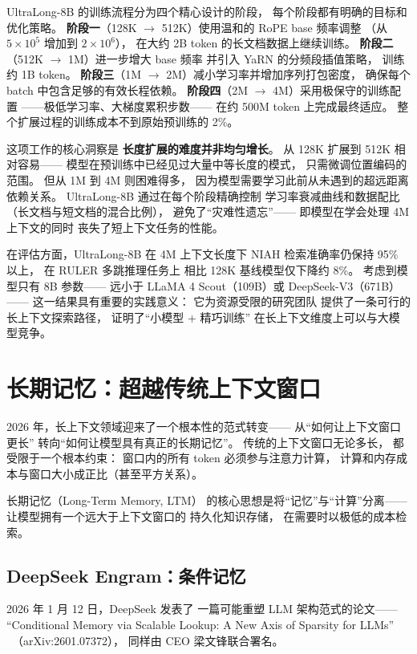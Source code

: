 UltraLong-8B 的训练流程分为四个精心设计的阶段，
每个阶段都有明确的目标和优化策略。
\textbf{阶段一}（128K $\to$ 512K）使用温和的 RoPE base 频率调整
（从 $5 \times 10^5$ 增加到 $2 \times 10^6$），
在大约 2B token 的长文档数据上继续训练。
\textbf{阶段二}（512K $\to$ 1M）进一步增大 base 频率
并引入 YaRN 的分频段插值策略，
训练约 1B token。
\textbf{阶段三}（1M $\to$ 2M）减小学习率并增加序列打包密度，
确保每个 batch 中包含足够的有效长程依赖。
\textbf{阶段四}（2M $\to$ 4M）采用极保守的训练配置
——极低学习率、大梯度累积步数——
在约 500M token 上完成最终适应。
整个扩展过程的训练成本不到原始预训练的 2\%。

这项工作的核心洞察是
\textbf{长度扩展的难度并非均匀增长}。
从 128K 扩展到 512K 相对容易——
模型在预训练中已经见过大量中等长度的模式，
只需微调位置编码的范围。
但从 1M 到 4M 则困难得多，
因为模型需要学习此前从未遇到的超远距离依赖关系。
UltraLong-8B 通过在每个阶段精确控制
学习率衰减曲线和数据配比
（长文档与短文档的混合比例），
避免了“灾难性遗忘”——
即模型在学会处理 4M 上下文的同时
丧失了短上下文任务的性能。

在评估方面，UltraLong-8B 在 4M 上下文长度下
NIAH 检索准确率仍保持 95\% 以上，
在 RULER 多跳推理任务上
相比 128K 基线模型仅下降约 8\%。
考虑到模型只有 8B 参数——
远小于 LLaMA 4 Scout（109B）或 DeepSeek-V3（671B）——
这一结果具有重要的实践意义：
它为资源受限的研究团队
提供了一条可行的长上下文探索路径，
证明了“小模型 + 精巧训练”
在长上下文维度上可以与大模型竞争。

\section{长期记忆：超越传统上下文窗口}
\label{sec:long-term-memory}

2026 年，长上下文领域迎来了一个根本性的范式转变——
从“如何让上下文窗口更长”
转向“如何让模型具有真正的长期记忆”。
传统的上下文窗口无论多长，
都受限于一个根本约束：
窗口内的所有 token 必须参与注意力计算，
计算和内存成本与窗口大小成正比（甚至平方关系）。

长期记忆（Long-Term Memory, LTM）
的核心思想是将“记忆”与“计算”分离——
让模型拥有一个远大于上下文窗口的
持久化知识存储，
在需要时以极低的成本检索。

\subsection{DeepSeek Engram：条件记忆}

2026 年 1 月 12 日，DeepSeek 发表了
一篇可能重塑 LLM 架构范式的论文——
“Conditional Memory via Scalable Lookup:
A New Axis of Sparsity for LLMs”
~\cite{engram2026}（arXiv:2601.07372），
同样由 CEO 梁文锋联合署名。

